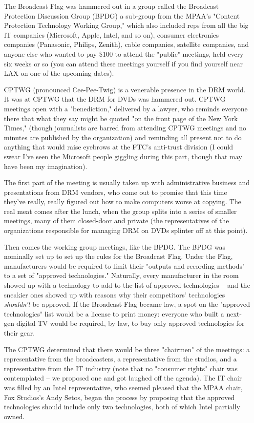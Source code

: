 The Broadcast Flag was hammered out in a group called the Broadcast
Protection Discussion Group (BPDG) a sub-group from the MPAA's
"Content Protection Technology Working Group," which also included
reps from all the big IT companies (Microsoft, Apple, Intel, and so
on), consumer electronics companies (Panasonic, Philips, Zenith),
cable companies, satellite companies, and anyone else who wanted to
pay \$100 to attend the "public" meetings, held every six weeks or
so (you can attend these meetings yourself if you find yourself
near LAX on one of the upcoming dates).

CPTWG (pronounced Cee-Pee-Twig) is a venerable presence in the DRM
world. It was at CPTWG that the DRM for DVDs was hammered out.
CPTWG meetings open with a "benediction," delivered by a lawyer,
who reminds everyone there that what they say might be quoted "on
the front page of the New York Times," (though journalists are
barred from attending CPTWG meetings and no minutes are published
by the organization) and reminding all present not to do anything
that would raise eyebrows at the FTC's anti-trust division (I could
swear I've seen the Microsoft people giggling during this part,
though that may have been my imagination).

The first part of the meeting is usually taken up with
administrative business and presentations from DRM vendors, who
come out to promise that this time they've really, really figured
out how to make computers worse at copying. The real meat comes
after the lunch, when the group splits into a series of smaller
meetings, many of them closed-door and private (the representatives
of the organizations responsible for managing DRM on DVDs splinter
off at this point).

Then comes the working group meetings, like the BPDG. The BPDG was
nominally set up to set up the rules for the Broadcast Flag. Under
the Flag, manufacturers would be required to limit their "outputs
and recording methods" to a set of "approved technologies."
Naturally, every manufacturer in the room showed up with a
technology to add to the list of approved technologies -- and the
sneakier ones showed up with reasons why their competitors'
technologies \emph{shouldn't} be approved. If the Broadcast Flag
became law, a spot on the "approved technologies" list would be a
license to print money: everyone who built a next-gen digital TV
would be required, by law, to buy only approved technologies for
their gear.

The CPTWG determined that there would be three "chairmen" of the
meetings: a representative from the broadcasters, a representative
from the studios, and a representative from the IT industry (note
that no "consumer rights" chair was contemplated -- we proposed one
and got laughed off the agenda). The IT chair was filled by an
Intel representative, who seemed pleased that the MPAA chair, Fox
Studios's Andy Setos, began the process by proposing that the
approved technologies should include only two technologies, both of
which Intel partially owned.

